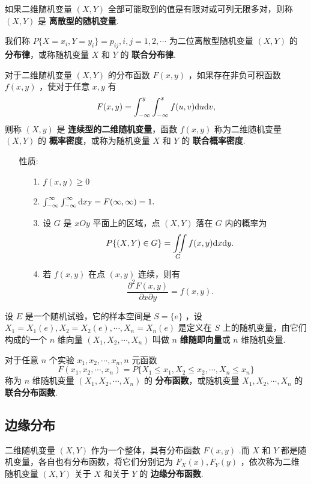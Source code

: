 \documentclass[UTF8,10pt]{ctexart}
\begin{document}
	如果二维随机变量 $ (X,Y) $ 全部可能取到的值是有限对或可列无限多对，则称 $ (X,Y) $ 是 \textbf{离散型的随机变量}.
	
	我们称 $ P\{X=x_{i},Y=y_{i}\}=p_{ij},i,j=1,2, \cdots $ 为二位离散型随机变量 $ (X,Y) $ 的 \textbf{分布律}，或称随机变量 $ X $ 和 $ Y $ 的 \textbf{联合分布律}.
	
	对于二维随机变量 $ (X,Y) $ 的分布函数 $ F(x,y) $ ，如果存在非负可积函数 $ f(x,y) $ ，使对于任意 $ x,y $ 有 $$ F(x,y)= \int_{- \infty }^{ y } \int_{- \infty }^{ x } f(u,v){\rm d}u{\rm d}v, $$ 则称 $ (X,y) $ 是 \textbf{连续型的二维随机变量}，函数 $ f(x,y) $ 称为二维随机变量 $ (X,Y) $ 的 \textbf{概率密度}，或称为随机变量 $ X $ 和 $ Y $ 的 \textbf{联合概率密度}.
	
	\begin{itemize}
		\item [性质:] {
			\begin{enumerate}
				\item [1.] $ f(x,y) \ge 0 $
				\item [2.] $ \int_{- \infty }^{ \infty } \int_{- \infty }^{ \infty }{\rm d}x{\rm y}=F( \infty , \infty )=1. $
				\item [3.] 设 $ G $ 是 $ xOy $ 平面上的区域，点 $ (X,Y) $ 落在 $ G $ 内的概率为 $$ P\{(X,Y) \in G \}= \iint\limits_{G} f(x,y){\rm d}x{\rm d}y. $$
				\item [4.] 若 $ f(x,y) $ 在点 $ (x,y) $ 连续，则有 $$ \frac{ \partial ^{2} F(x,y) }{ \partial x \partial y }=f(x,y). $$
			\end{enumerate}
		}
	\end{itemize}

	设 $ E $ 是一个随机试验，它的样本空间是 $ S=\{e\} $ ，设 $ X_{1}=X_{1}(e),X_{2}=X_{2}(e), \cdots , X_{n}=X_{n}(e) $ 是定义在 $ S $ 上的随机变量，由它们构成的一个 $ n $ 维向量 $ (X_{1},X_{2}, \cdots , X_{n}) $ 叫做 $ n $ \textbf{维随即向量}或 $ n $ 维随机变量.
	
	对于任意 $ n $ 个实验 $ x_{1},x_{2}, \cdots ,x_{n},n $ 元函数 $$ F(x_{1},x_{2}, \cdots ,x_{n})=P\{X_{1} \le x_{1},X_{2} \le x_{2}, \cdots ,X_{n} \le x_{n} \} $$ 称为 $ n $ 维随机变量 $ (X_{1},X_{2}, \cdots ,X_{n}) $ 的 \textbf{分布函数}，或随机变量 $ X_{1},X_{2}, \cdots ,X_{n} $ 的 \textbf{联合分布函数}.
	
	\subsection{边缘分布}
	
	二维随机变量 $ (X,Y) $ 作为一个整体，具有分布函数 $ F(x,y) $ .而 $ X $ 和 $ Y $ 都是随机变量，各自也有分布函数，将它们分别记为 $ F_{X}(x),F_{Y}(y) $ ，依次称为二维随机变量 $ (X,Y) $ 关于 $ X $ 和关于 $ Y $ 的 \textbf{边缘分布函数}.
	
\end{document}
